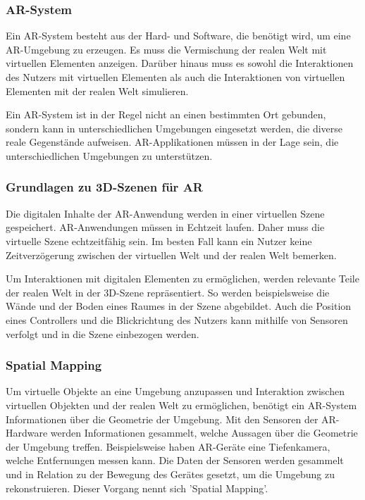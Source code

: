 \subsubsection{AR-System}

Ein AR-System besteht aus der Hard- und Software, die benötigt wird, um eine AR-Umgebung zu erzeugen. Es muss die Vermischung der realen Welt mit virtuellen Elementen anzeigen. Darüber hinaus muss es sowohl die Interaktionen des Nutzers mit virtuellen Elementen als auch die Interaktionen von virtuellen Elementen mit der realen Welt simulieren.

Ein AR-System ist in der Regel nicht an einen bestimmten Ort gebunden, sondern kann in unterschiedlichen Umgebungen eingesetzt werden, die diverse reale Gegenstände aufweisen. AR-Applikationen müssen in der Lage sein, die unterschiedlichen Umgebungen zu unterstützen.\citep{GrundlagenAR}


\subsubsection{Grundlagen zu 3D-Szenen für AR}

Die digitalen Inhalte der AR-Anwendung werden in einer virtuellen Szene gespeichert. 
AR-Anwendungen müssen in Echtzeit laufen. Daher muss die virtuelle Szene echtzeitfähig sein. Im besten Fall kann ein Nutzer keine Zeitverzögerung  zwischen der virtuellen Welt und der realen Welt bemerken.

Um Interaktionen mit digitalen Elementen zu ermöglichen, werden relevante Teile der realen Welt in der 3D-Szene repräsentiert. 
So werden beispielsweise die Wände und der Boden eines Raumes in der Szene abgebildet. Auch die Position eines Controllers und die Blickrichtung des Nutzers kann mithilfe von Sensoren verfolgt und in die Szene einbezogen werden.

\subsubsection{Spatial Mapping} 
Um virtuelle Objekte an eine Umgebung anzupassen und Interaktion zwischen virtuellen Objekten und der realen Welt zu ermöglichen, benötigt ein AR-System Informationen über die Geometrie der Umgebung. Mit den Sensoren der AR-Hardware werden Informationen gesammelt, welche Aussagen über die Geometrie der Umgebung treffen. Beispielsweise haben AR-Geräte eine Tiefenkamera, welche Entfernungen messen kann. Die Daten der Sensoren werden gesammelt und in Relation zu der Bewegung des Gerätes gesetzt, um die Umgebung zu rekonstruieren. Dieser Vorgang nennt sich 'Spatial Mapping'. 

